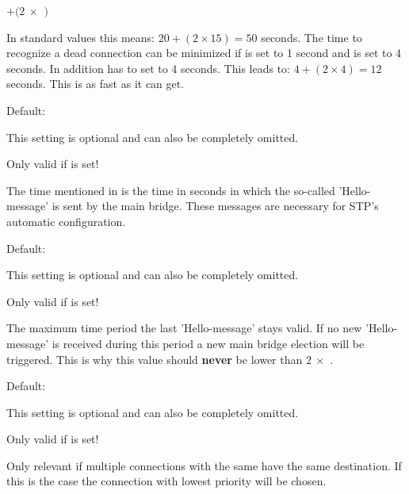 \begin{description}
  \textbf{$ + (2\ \times$ $)$}

  In standard values this means: $20 + (2 \times 15) = 50$
  seconds. The time to recognize a dead connection can be minimized
  if  is set to 1 second and 
   is set to 4 seconds. 
  In addition  has to set to 4
  seconds. This leads to: $4 + (2 \times 4) = 12$ seconds. This is as 
  fast as it can get.


  Default: 

  This setting is optional and can also be completely omitted.

  Only valid if  is set!

  The time mentioned in  is the time 
  in seconds in which the so-called 'Hello-message' is sent by the 
  main bridge. These messages are necessary for STP's automatic configuration.


  Default: 

  This setting is optional and can also be completely omitted.

  Only valid if  is set!

  The maximum time period the last 'Hello-message' stays valid. If 
  no new 'Hello-message' is received during this period a new main bridge 
  election will be triggered. This is why this value should \textbf{never} 
  be lower than $2\ \times$ .


  Default: 

  This setting is optional and can also be completely omitted.

  Only valid if  is set!
  
  Only relevant if multiple connections with the same
   have the same destination. 
  If this is the case the connection with lowest priority will 
  be chosen.


\end{description}
